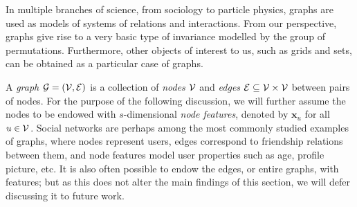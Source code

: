 

In multiple branches of science, from sociology to particle physics, graphs are used as models of systems of relations and interactions. From our perspective, graphs give rise to a very basic type of invariance modelled by the group of permutations. 
Furthermore, other objects of interest to us, such as grids and sets, can be obtained as a particular case of graphs.  
%




A {\em graph} ${\mathcal{G}} = ({\mathcal{V}}, {\mathcal{E}})$ is a collection of {\em nodes} ${\mathcal{V}}$  and {\em edges} ${\mathcal{E}} \subseteq {\mathcal{V}}\times {\mathcal{V}}$ between pairs of nodes. For the purpose of the following discussion, we will further assume the nodes to be endowed with $s$-dimensional {\em node features}, 
denoted by $\mathbf{x}_u$ for all $u \in {\mathcal{V}}$. 
%
Social networks are perhaps among the most commonly studied examples of graphs, where nodes represent users, edges correspond to friendship relations between them, and node features model user properties such as age, profile picture, etc. It is also often possible to endow the edges, or entire graphs, with features; but as this does not alter the main findings of this section, we will defer discussing it to future work.


